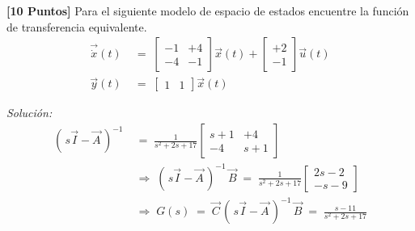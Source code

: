 \documentclass[ a4paper, twoside, 11pt]{article}
\begin{document}
\begin{problem}
\textbf{[10 Puntos]} Para el siguiente modelo de espacio de estados encuentre la funci\'on de transferencia equivalente. 
\begin{align*}
\vec{\dot{x}}(t) \; & = \; 
\left[ \begin{array}{cc}
-1 & +4 \\ -4 & -1
\end{array} \right] \vec{x}(t) + 
\left[ \begin{array}{c}
+2 \\ -1
\end{array} \right] \vec{u}(t) \\[2ex]
\vec{y}(t) \; & = \; 
\left[ \begin{array}{cc}
1 & 1
\end{array} \right] \vec{x}(t)
\end{align*}

\emph{Soluci\'on:}
\begin{align*}
( \, s \vec{I} - \vec{A} \, )^{-1} \;
& = \; \frac{1}{s^2 + 2s + 17}
\left[ \begin{array}{cc}
s+1 & +4 \\ -4 & s+1
\end{array} \right] \\[2ex]
& \Longrightarrow \; 
( \, s \vec{I} - \vec{A} \, )^{-1} \, \vec{B} \; = \;
\frac{1}{s^2 + 2s + 17}
\left[ \begin{array}{c}
2s - 2 \\ -s - 9
\end{array} \right] \\[2ex]
& \Longrightarrow \; G(s) \; = \;
\vec{C} \, ( \, s \vec{I} - \vec{A} \, )^{-1} \, \vec{B} \; = \;
\frac{s - 11}{s^2 + 2s + 17}
\end{align*}

\end{problem}
\vspace{\baselineskip}
\end{document}
